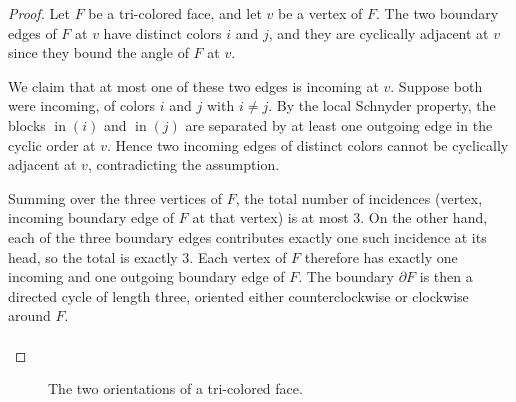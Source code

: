 \documentclass[11pt]{amsart}
\newcommand{\inn}{\operatorname{in}}
\theoremstyle{plain}
\theoremstyle{definition}
\theoremstyle{remark}
\begin{document}
\begin{proof}
Let $F$ be a tri-colored face, and let $v$ be a vertex of $F$. The two boundary edges of $F$ at $v$ have distinct colors $i$ and $j$, and they are cyclically adjacent at $v$ since they bound the angle of $F$ at $v$.

We claim that at most one of these two edges is incoming at $v$. Suppose both were incoming, of colors $i$ and $j$ with $i \neq j$. By the local Schnyder property, the blocks $\inn(i)$ and $\inn(j)$ are separated by at least one outgoing edge in the cyclic order at $v$. Hence two incoming edges of distinct colors cannot be cyclically adjacent at $v$, contradicting the assumption.

Summing over the three vertices of $F$, the total number of incidences (vertex, incoming boundary edge of $F$ at that vertex) is at most $3$. On the other hand, each of the three boundary edges contributes exactly one such incidence at its head, so the total is exactly $3$. Each vertex of $F$ therefore has exactly one incoming and one outgoing boundary edge of $F$. The boundary $\partial F$ is then a directed cycle of length three, oriented either counterclockwise or clockwise around $F$.\\\\
\end{proof}

\begin{figure}[H]
\centering
{}
\caption{The two orientations of a tri-colored face.}
\label{fig:tricolored-orientations}
\end{figure}
\end{document}
